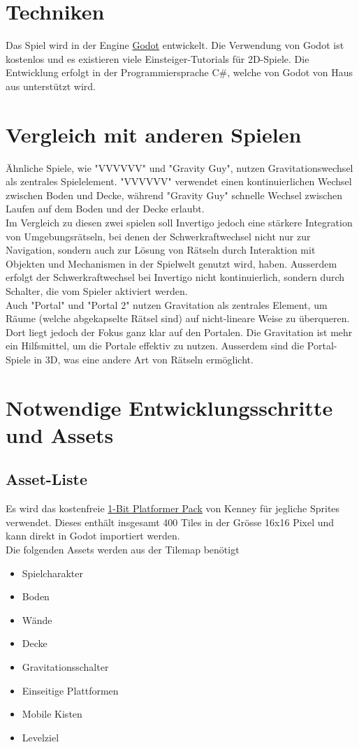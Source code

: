 \documentclass{article}
\begin{document}
\section{Techniken}
Das Spiel wird in der Engine \href{https://godotengine.org/}{Godot} entwickelt. Die Verwendung von Godot ist kostenlos und es existieren viele Einsteiger-Tutorials für 2D-Spiele.
Die Entwicklung erfolgt in der Programmiersprache C\#, welche von Godot von Haus aus unterstützt wird.

\section{Vergleich mit anderen Spielen}

Ähnliche Spiele, wie "VVVVVV" und "Gravity Guy", nutzen Gravitationswechsel als zentrales Spielelement.
"VVVVVV" verwendet einen kontinuierlichen Wechsel zwischen Boden und Decke, während "Gravity Guy" schnelle Wechsel zwischen Laufen auf dem Boden und der Decke erlaubt.
\\
Im Vergleich zu diesen zwei spielen soll Invertigo jedoch eine stärkere Integration von Umgebungsrätseln, bei denen der Schwerkraftwechsel nicht nur zur Navigation,
sondern auch zur Lösung von Rätseln durch Interaktion mit Objekten und Mechanismen in der Spielwelt genutzt wird, haben.
Ausserdem erfolgt der Schwerkraftwechsel bei Invertigo nicht kontinuierlich, sondern durch Schalter, die vom Spieler aktiviert werden.
\\
Auch "Portal" und "Portal 2" nutzen Gravitation als zentrales Element, um Räume (welche abgekapselte Rätsel sind) auf nicht-lineare Weise zu überqueren.
Dort liegt jedoch der Fokus ganz klar auf den Portalen. Die Gravitation ist mehr ein Hilfsmittel, um die Portale effektiv zu nutzen.
Ausserdem sind die Portal-Spiele in 3D, was eine andere Art von Rätseln ermöglicht.

\section{Notwendige Entwicklungsschritte und Assets}
\subsection{Asset-Liste}
Es wird das kostenfreie \href{https://kenney.nl/assets/1-bit-platformer-pack}{1-Bit Platformer Pack} von Kenney für jegliche Sprites verwendet.
Dieses enthält insgesamt 400 Tiles in der Grösse 16x16 Pixel und kann direkt in Godot importiert werden.
\\
Die folgenden Assets werden aus der Tilemap benötigt
\begin{itemize}
    \item Spielcharakter
    \item Boden
    \item Wände
    \item Decke
    \item Gravitationsschalter
    \item Einseitige Plattformen
    \item Mobile Kisten
    \item Levelziel
\end{itemize}
\end{document}
